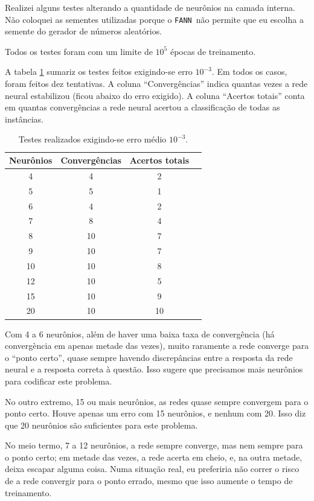 \documentclass{article}
\newcommand{\FANN}{{\lstinline"FANN"}}
\begin{document}
Realizei alguns testes alterando a quantidade de neurônios na camada interna.
Não coloquei as sementes utilizadas porque o \FANN\ não permite que eu escolha
a semente do gerador de números aleatórios.

Todos os testes foram com um limite de $10^5$ épocas de treinamento.

A tabela \ref{tabela} sumariz os testes feitos exigindo-se erro $10^{-3}$.
Em todos os casos, foram feitos dez tentativas.
A coluna ``Convergências'' indica quantas vezes a rede neural estabilizou
(ficou abaixo do erro exigido).
A coluna ``Acertos totais'' conta em quantas convergências
a rede neural acertou a classificação de todas as instâncias.

\begin{table}[h]
    \centering
    \begin{tabular}{c c c c}
        Neurônios & Convergências & Acertos totais \\\hline
        4 & 4 & 2 \\
        5 & 5 & 1 \\
        6 & 4 & 2 \\
        7 & 8 & 4 \\
        8 & 10 & 7 \\
        9 & 10 & 7 \\
        10 & 10 & 8 \\
        12 & 10 & 5 \\
        15 & 10 & 9 \\
        20 & 10 & 10 \\
    \end{tabular}
    \caption{Testes realizados exigindo-se erro médio $10^{-3}$.}
    \label{tabela}
\end{table}

Com 4 a 6 neurônios, além de haver uma baixa taxa de convergência
(há convergència em apenas metade das vezes),
muito raramente a rede converge para o ``ponto certo'',
quase sempre havendo discrepâncias entre a resposta da rede neural
e a resposta correta à questão.
Isso sugere que precisamos mais neurônios para codificar este problema.

No outro extremo, 15 ou mais neurônios,
as redes quase sempre convergem para o ponto certo.
Houve apenas um erro com 15 neurônios, e nenhum com 20.
Isso diz que 20 neurônios são suficientes para este problema.

No meio termo, 7 a 12 neurônios, a rede sempre converge,
mas nem sempre para o ponto certo;
em metade das vezes, a rede acerta em cheio, e,
na outra metade, deixa escapar alguma coisa.
Numa situação real, eu preferiria não correr o risco
de a rede convergir para o ponto errado,
mesmo que isso aumente o tempo de treinamento.
\end{document}
